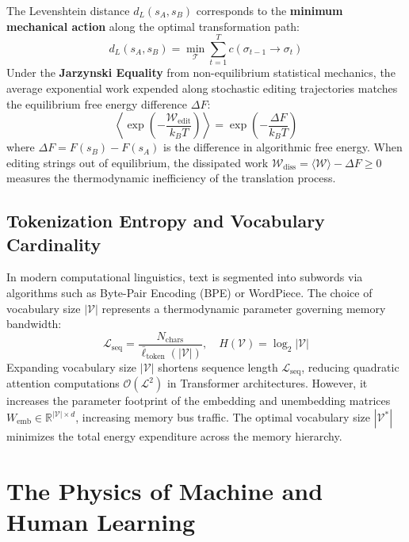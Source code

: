 \documentclass[11pt,letterpaper]{article}
\begin{document}
The Levenshtein distance $d_L(s_A, s_B)$ corresponds to the \textbf{minimum mechanical action} along the optimal transformation path:
\begin{equation}
d_L(s_A, s_B) = \min_{\mathcal{T}} \sum_{t=1}^T c(\sigma_{t-1} \to \sigma_t)
\end{equation}
Under the \textbf{Jarzynski Equality} from non-equilibrium statistical mechanics, the average exponential work expended along stochastic editing trajectories matches the equilibrium free energy difference $\Delta F$:
\begin{equation}
\left\langle \exp\left(-\frac{\mathcal{W}_{\text{edit}}}{k_B T}\right) \right\rangle = \exp\left(-\frac{\Delta F}{k_B T}\right)
\end{equation}
where $\Delta F = F(s_B) - F(s_A)$ is the difference in algorithmic free energy. When editing strings out of equilibrium, the dissipated work $\mathcal{W}_{\text{diss}} = \langle \mathcal{W} \rangle - \Delta F \ge 0$ measures the thermodynamic inefficiency of the translation process.

\subsection{Tokenization Entropy and Vocabulary Cardinality}
In modern computational linguistics, text is segmented into subwords via algorithms such as Byte-Pair Encoding (BPE) or WordPiece. The choice of vocabulary size $|\mathcal{V}|$ represents a thermodynamic parameter governing memory bandwidth:
\begin{equation}
\mathcal{L}_{\text{seq}} = \frac{N_{\text{chars}}}{\bar{\ell}_{\text{token}}(|\mathcal{V}|)}, \quad H(\mathcal{V}) = \log_2 |\mathcal{V}|
\end{equation}
Expanding vocabulary size $|\mathcal{V}|$ shortens sequence length $\mathcal{L}_{\text{seq}}$, reducing quadratic attention computations $\mathcal{O}(\mathcal{L}^2)$ in Transformer architectures. However, it increases the parameter footprint of the embedding and unembedding matrices $W_{\text{emb}} \in \mathbb{R}^{|\mathcal{V}| \times d}$, increasing memory bus traffic. The optimal vocabulary size $|\mathcal{V}^*|$ minimizes the total energy expenditure across the memory hierarchy.

\section{The Physics of Machine and Human Learning}
\end{document}
